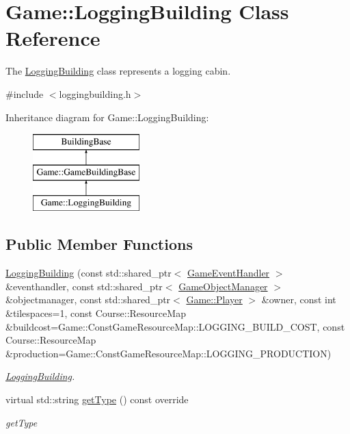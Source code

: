 \hypertarget{class_game_1_1_logging_building}{\section{Game\-:\-:Logging\-Building Class Reference}
\label{class_game_1_1_logging_building}
}


The \hyperlink{class_game_1_1_logging_building}{Logging\-Building} class represents a logging cabin.  




{\ttfamily \#include $<$loggingbuilding.\-h$>$}

Inheritance diagram for Game\-:\-:Logging\-Building\-:\begin{figure}[H]
\begin{center}
\leavevmode
\includegraphics[height=3.000000cm]{class_game_1_1_logging_building}
\end{center}
\end{figure}
\subsection*{Public Member Functions}
\begin{DoxyCompactItemize}
\item 
\hyperlink{class_game_1_1_logging_building_a207f9472b3a0df5853a37b03bd84a937}{Logging\-Building} (const std\-::shared\-\_\-ptr$<$ \hyperlink{class_game_1_1_game_event_handler}{Game\-Event\-Handler} $>$ \&eventhandler, const std\-::shared\-\_\-ptr$<$ \hyperlink{class_game_1_1_game_object_manager}{Game\-Object\-Manager} $>$ \&objectmanager, const std\-::shared\-\_\-ptr$<$ \hyperlink{class_game_1_1_player}{Game\-::\-Player} $>$ \&owner, const int \&tilespaces=1, const Course\-::\-Resource\-Map \&buildcost=Game\-::\-Const\-Game\-Resource\-Map\-::\-L\-O\-G\-G\-I\-N\-G\-\_\-\-B\-U\-I\-L\-D\-\_\-\-C\-O\-S\-T, const Course\-::\-Resource\-Map \&production=Game\-::\-Const\-Game\-Resource\-Map\-::\-L\-O\-G\-G\-I\-N\-G\-\_\-\-P\-R\-O\-D\-U\-C\-T\-I\-O\-N)
\begin{DoxyCompactList}\small\item\em \hyperlink{class_game_1_1_logging_building}{Logging\-Building}. \end{DoxyCompactList}\item 
virtual std\-::string \hyperlink{class_game_1_1_logging_building_a052eb3f8b6496e0b9028d7f3281f9f9c}{get\-Type} () const override
\begin{DoxyCompactList}\small\item\em get\-Type \end{DoxyCompactList}\end{DoxyCompactItemize}
